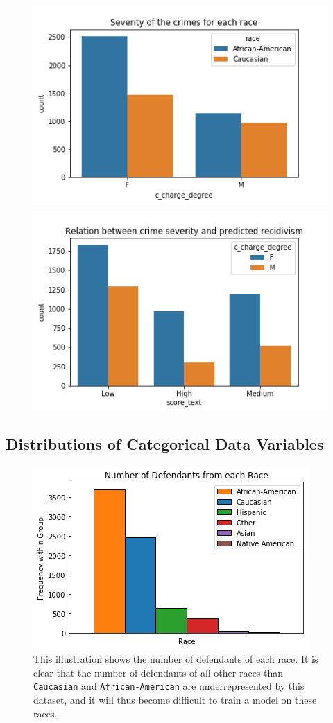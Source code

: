 \documentclass[11pt, fleqn, titlepage]{article}
\begin{document}
	\begin{figure}[H]
		\centering
		\includegraphics[width=0.5\linewidth]{imgs/c_charge_degree}
		\caption{}
	\end{figure}
	
	\begin{figure}[H]
		\centering
		\includegraphics[width=0.5\linewidth]{imgs/charge_degree_score}
		\caption{}
	\end{figure}

	\subsection{Distributions of Categorical Data Variables}
	\begin{figure}
		\centering
		\includegraphics[width=0.5\linewidth]{imgs/races}
		\caption{This illustration shows the number of defendants of each race. It is clear that the number of defendants of all other races than \texttt{Caucasian} and \texttt{African-American} are underrepresented by this dataset, and it will thus become difficult to train a model on these races.}
		\label{fig:races}
	\end{figure}
	
\end{document}
